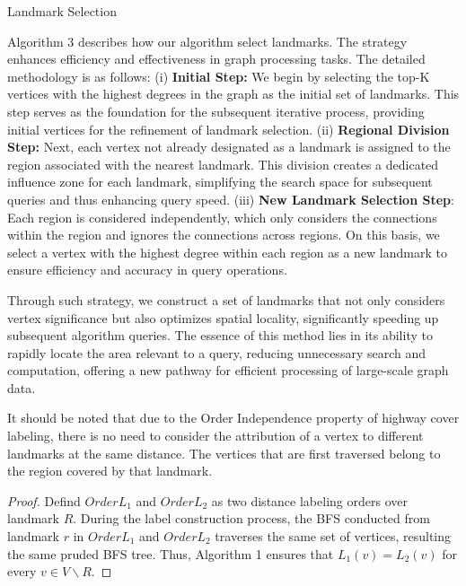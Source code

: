 \documentclass[sigconf]{acmart}
\begin{document}
\begin{algorithm}
\caption{Landmark Selection}
\SetAlgoLined
\DontPrintSemicolon
{}
\end{algorithm}
%
%
Algorithm 3 describes how our algorithm select landmarks. The strategy enhances efficiency and effectiveness in graph processing tasks. The detailed methodology is as follows: (i) \textbf{Initial Step:} We begin by selecting the top-K vertices with the highest degrees in the graph as the initial set of landmarks. This step serves as the foundation for the subsequent iterative process, providing initial vertices for the refinement of landmark selection. (ii) \textbf{Regional Division Step:} Next, each vertex not already designated as a landmark is assigned to the region associated with the nearest landmark. This division creates a dedicated influence zone for each landmark, simplifying the search space for subsequent queries and thus enhancing query speed. (iii) \textbf{New Landmark Selection Step}: Each region is considered independently, which only considers the connections within the region and ignores the connections across regions. On this basis, we select a vertex with the highest degree within each region as a new landmark to ensure efficiency and accuracy in query operations.\par

Through such strategy, we construct a set of landmarks that not only considers vertex significance but also optimizes spatial locality, significantly speeding up subsequent algorithm queries. The essence of this method lies in its ability to rapidly locate the area relevant to a query, reducing unnecessary search and computation, offering a new pathway for efficient processing of large-scale graph data.\par

It should be noted that due to the Order Independence \cite{ref7} property  of highway cover labeling, there is no need to consider the attribution of a vertex to different landmarks at the same distance. The vertices that are first traversed belong to the region covered by that landmark.\par
%
%
\begin{proof}
    Defind $Order{L_{1}}$ and $Order{L_{2}}$ as two distance labeling orders over landmark $R$. During the label construction process, the BFS conducted from landmark $r$ in $Order{L_{1}}$ and $Order{L_{2}}$ traverses the same set of vertices, resulting the same pruded BFS tree. Thus, Algorithm 1 ensures that $L_{1}(v)=L_{2}(v)$ for every $v \in V \backslash R$.
\end{proof}
\end{document}
